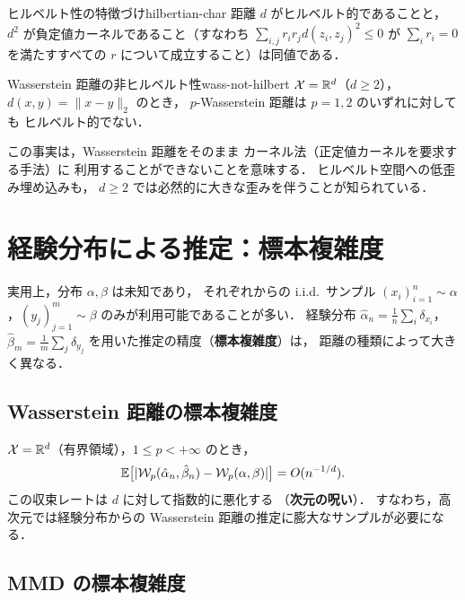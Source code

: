 \begin{proposition}{ヒルベルト性の特徴づけ}{hilbertian-char}
距離 $d$ がヒルベルト的であることと，
$d^2$ が負定値カーネルであること（すなわち
$\sum_{i,j} r_i r_j d(z_i, z_j)^2 \leq 0$
が $\sum_i r_i = 0$ を満たすすべての $r$ について成立すること）は同値である．
\end{proposition}

\begin{proposition}{Wasserstein 距離の非ヒルベルト性}{wass-not-hilbert}
$\mathcal{X} = \mathbb{R}^d$（$d \geq 2$），$d(x,y) = \|x - y\|_2$ のとき，
$p$-Wasserstein 距離は $p = 1, 2$ のいずれに対しても
ヒルベルト的でない．
\end{proposition}

この事実は，Wasserstein 距離をそのまま
カーネル法（正定値カーネルを要求する手法）に
利用することができないことを意味する．
ヒルベルト空間への低歪み埋め込みも，
$d \geq 2$ では必然的に大きな歪みを伴うことが知られている．


\section{経験分布による推定：標本複雑度}\label{sec:sample-complexity}

実用上，分布 $\alpha, \beta$ は未知であり，
それぞれからの i.i.d.\ サンプル
$(x_i)_{i=1}^n \sim \alpha$，$(y_j)_{j=1}^m \sim \beta$
のみが利用可能であることが多い．
経験分布
$\hat{\alpha}_n = \frac{1}{n}\sum_i \delta_{x_i}$，
$\hat{\beta}_m = \frac{1}{m}\sum_j \delta_{y_j}$
を用いた推定の精度（\textbf{標本複雑度}）は，
距離の種類によって大きく異なる．

\subsection{Wasserstein 距離の標本複雑度}\label{subsec:ot-rate}

$\mathcal{X} = \mathbb{R}^d$（有界領域），$1 \leq p < +\infty$ のとき，
\begin{equation}\label{eq:ot-rate}
  \mathbb{E}\bigl[|\mathcal{W}_p(\hat{\alpha}_n, \hat{\beta}_n) - \mathcal{W}_p(\alpha, \beta)|\bigr]
  = O(n^{-1/d}).
\end{equation}
この収束レートは $d$ に対して指数的に悪化する
（\textbf{次元の呪い}）．
すなわち，高次元では経験分布からの
Wasserstein 距離の推定に膨大なサンプルが必要になる．

\subsection{MMD の標本複雑度}\label{subsec:mmd-rate}


